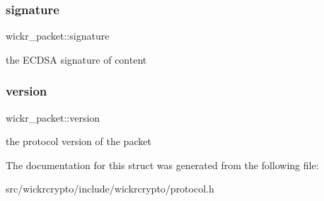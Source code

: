 \subsubsection{\texorpdfstring{signature}{signature}}
{\footnotesize\ttfamily wickr\+\_\+packet\+::signature}

the E\+C\+D\+SA signature of \textquotesingle{}content\textquotesingle{} \mbox{\label{structwickr__packet_a35c17c926c267a603e810b88961c2bf3}} 
\subsubsection{\texorpdfstring{version}{version}}
{\footnotesize\ttfamily wickr\+\_\+packet\+::version}

the protocol version of the packet 

The documentation for this struct was generated from the following file\+:\begin{DoxyCompactItemize}
\item 
src/wickrcrypto/include/wickrcrypto/protocol.\+h\end{DoxyCompactItemize}
